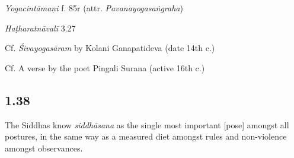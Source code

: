 \begin{ekdosis}

\begin{testimonia}[hp01_037]
\emph{Yogacintāmaṇi} f. 85r (attr. \emph{Pavanayogasaṅgraha})

\begin{versinnote}
\end{versinnote}

\emph{Haṭharatnāvalī} 3.27

\begin{versinnote}
\end{versinnote}

Cf. \emph{Śivayogasāram} by Kolani Ganapatideva (date 14th c.)

\begin{versinnote}
\end{versinnote}

Cf. A verse by the poet Pingali Surana (active 16th c.)

\begin{versinnote}
\end{versinnote}

\end{testimonia}

\subsection*{1.38}
\begin{translation}[hp01_038]
The Siddhas know \emph{siddhāsana} as the single most important [pose] amongst all postures, in the same way as a measured diet amongst rules and non-violence amongst observances.
\end{translation}


\end{ekdosis}
